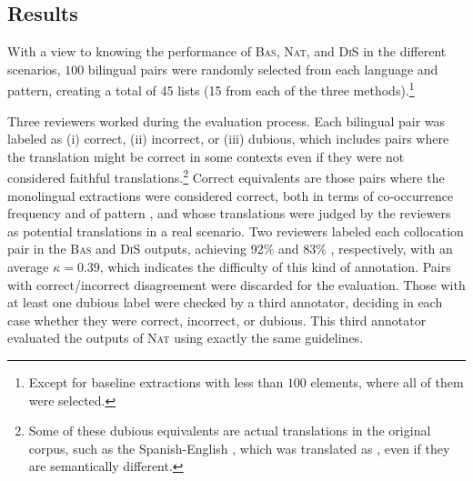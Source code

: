 \documentclass[output=paper,modfonts,nonflat]{langsci/langscibook}
\begin{document}
%
\subsection{Results}
With a view to knowing the performance of \textsc{Bas}, \textsc{Nat}, and \textsc{DiS}
in the different scenarios, $100$ bilingual  pairs were randomly selected
from each language and pattern, creating a total of 45 lists (15 from each of the three methods).\footnote{Except for baseline extractions with less than $100$ elements, where all of them were selected.}

Three reviewers worked during the evaluation process. Each bilingual 
pair was labeled as (i) correct, (ii) incorrect, or (iii) dubious, which includes pairs where the
translation might be correct in some contexts even if they were not considered faithful
translations.\footnote{Some of these dubious equivalents are actual translations in the
  original corpus, such as the Spanish-English , which was translated as ,
  even if they are semantically different.}
Correct  equivalents are those pairs where the monolingual extractions were
considered correct, both in terms of co-occurrence frequency and of  pattern
, and whose translations were judged by the reviewers as potential
translations in a real scenario.
Two reviewers labeled each collocation pair in the \textsc{Bas} and \textsc{DiS} outputs, achieving 92\% and 83\% , respectively, with an average $\kappa=0.39$, which
indicates the difficulty of this kind of annotation. Pairs with correct/incorrect disagreement
were discarded for the evaluation. Those with at least one dubious label were checked by a
third annotator, deciding in each case whether they were correct, incorrect, or dubious.
This third annotator evaluated the outputs of \textsc{Nat} using exactly the same guidelines.
\end{document}
